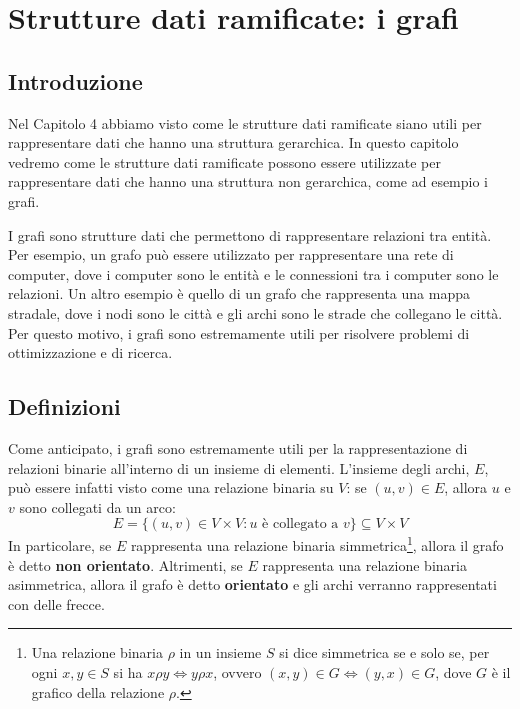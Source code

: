 \chapter{Strutture dati ramificate: i grafi}
\section{Introduzione}
Nel Capitolo 4 abbiamo visto come le strutture dati ramificate siano utili per rappresentare dati che hanno una struttura gerarchica. In questo capitolo vedremo come le strutture dati ramificate possono essere utilizzate per rappresentare dati che hanno una struttura non gerarchica, come ad esempio i grafi.

I grafi sono strutture dati che permettono di rappresentare relazioni tra entità. Per esempio, un grafo può essere utilizzato per rappresentare una rete di computer, dove i computer sono le entità e le connessioni tra i computer sono le relazioni. Un altro esempio è quello di un grafo che rappresenta una mappa stradale, dove i nodi sono le città e gli archi sono le strade che collegano le città. Per questo motivo, i grafi sono estremamente utili per risolvere problemi di ottimizzazione e di ricerca.
\section{Definizioni}

Come anticipato, i grafi sono estremamente utili per la rappresentazione di relazioni binarie all'interno di un insieme di elementi. L'insieme degli archi, $E$, può essere infatti visto come una relazione binaria su $V$: se $(u, v) \in E$, allora $u$ e $v$ sono collegati da un arco:
\begin{equation}
    E = \{(u, v) \in V \times V : u \text{ è collegato a } v\} \subseteq V \times V
\end{equation}
In particolare, se $E$ rappresenta una relazione binaria simmetrica\footnote{Una relazione binaria $\rho$ in un insieme $S$ si dice simmetrica se e solo se, per ogni $x,y \in S$ si ha $x \rho y \iff y \rho x$, ovvero $(x,y) \in G \iff (y,x) \in G$, dove $G$ è il grafico della relazione $\rho$.}, allora il grafo è detto \textbf{non orientato}. Altrimenti, se $E$ rappresenta una relazione binaria asimmetrica, allora il grafo è detto \textbf{orientato} e gli archi verranno rappresentati con delle frecce.


